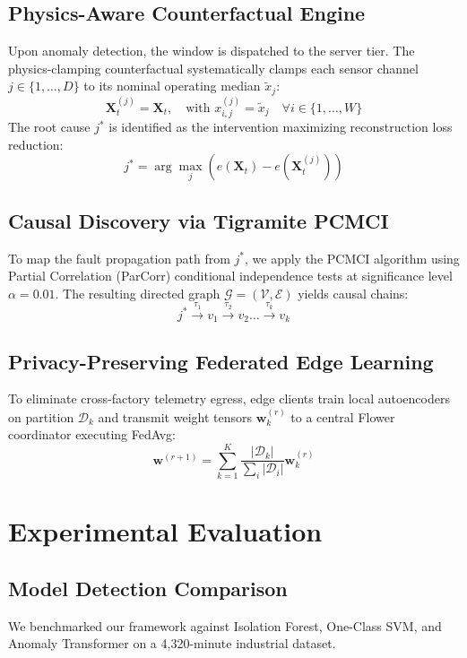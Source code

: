\documentclass[conference]{IEEEtran}
\begin{document}
\subsection{Physics-Aware Counterfactual Engine}
Upon anomaly detection, the window is dispatched to the server tier. The physics-clamping counterfactual systematically clamps each sensor channel $j \in \{1, \dots, D\}$ to its nominal operating median $\tilde{x}_j$:
\begin{equation}
\mathbf{X}_t^{(j)} = \mathbf{X}_t, \quad \text{with } x_{i,j}^{(j)} = \tilde{x}_j \quad \forall i \in \{1, \dots, W\}
\end{equation}
The root cause $j^*$ is identified as the intervention maximizing reconstruction loss reduction:
\begin{equation}
j^* = \arg\max_j \left( e(\mathbf{X}_t) - e(\mathbf{X}_t^{(j)}) \right)
\end{equation}

\subsection{Causal Discovery via Tigramite PCMCI}
To map the fault propagation path from $j^*$, we apply the PCMCI algorithm using Partial Correlation (ParCorr) conditional independence tests at significance level $\alpha = 0.01$. The resulting directed graph $\mathcal{G} = (\mathcal{V}, \mathcal{E})$ yields causal chains:
\begin{equation}
j^* \xrightarrow{\tau_1} v_1 \xrightarrow{\tau_2} v_2 \dots \xrightarrow{\tau_k} v_k
\end{equation}

\subsection{Privacy-Preserving Federated Edge Learning}
To eliminate cross-factory telemetry egress, edge clients train local autoencoders on partition $\mathcal{D}_k$ and transmit weight tensors $\mathbf{w}_k^{(r)}$ to a central Flower coordinator executing FedAvg:
\begin{equation}
\mathbf{w}^{(r+1)} = \sum_{k=1}^K \frac{|\mathcal{D}_k|}{\sum_i |\mathcal{D}_i|} \mathbf{w}_k^{(r)}
\end{equation}

\section{Experimental Evaluation}
\subsection{Model Detection Comparison}
We benchmarked our framework against Isolation Forest, One-Class SVM, and Anomaly Transformer on a 4,320-minute industrial dataset.
\end{document}
